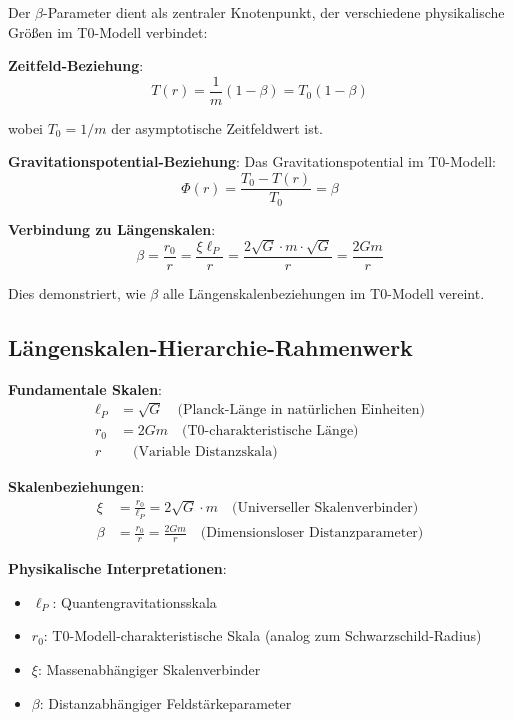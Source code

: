 \documentclass[12pt,a4paper]{article}
\begin{document}
Der $\beta$-Parameter dient als zentraler Knotenpunkt, der verschiedene physikalische Größen im T0-Modell verbindet:

\textbf{Zeitfeld-Beziehung}:
\begin{equation}
	T(r) = \frac{1}{m}(1 - \beta) = T_0(1 - \beta)
\end{equation}

wobei $T_0 = 1/m$ der asymptotische Zeitfeldwert ist.

\textbf{Gravitationspotential-Beziehung}:
Das Gravitationspotential im T0-Modell:
\begin{equation}
	\Phi(r) = \frac{T_0 - T(r)}{T_0} = \beta
\end{equation}

\textbf{Verbindung zu Längenskalen}:
\begin{equation}
	\beta = \frac{r_0}{r} = \frac{\xi \ell_P}{r} = \frac{2\sqrt{G} \cdot m \cdot \sqrt{G}}{r} = \frac{2Gm}{r}
\end{equation}

Dies demonstriert, wie $\beta$ alle Längenskalenbeziehungen im T0-Modell vereint.

\subsection{Längenskalen-Hierarchie-Rahmenwerk}
\label{subsec:length_scale_framework}

\begin{tcolorbox}[colback=blue!5!white,colframe=blue!75!black,title=Vollständige T0-Längenskalen-Hierarchie]
	
	\textbf{Fundamentale Skalen}:
	\begin{align}
		\ell_P &= \sqrt{G} \quad \text{(Planck-Länge in natürlichen Einheiten)} \\
		r_0 &= 2Gm \quad \text{(T0-charakteristische Länge)} \\
		r &\quad \text{(Variable Distanzskala)}
	\end{align}
	
	\textbf{Skalenbeziehungen}:
	\begin{align}
		\xi &= \frac{r_0}{\ell_P} = 2\sqrt{G} \cdot m \quad \text{(Universeller Skalenverbinder)} \\
		\beta &= \frac{r_0}{r} = \frac{2Gm}{r} \quad \text{(Dimensionsloser Distanzparameter)}
	\end{align}
	
	\textbf{Physikalische Interpretationen}:
	\begin{itemize}
		\item $\ell_P$: Quantengravitationsskala
		\item $r_0$: T0-Modell-charakteristische Skala (analog zum Schwarzschild-Radius)
		\item $\xi$: Massenabhängiger Skalenverbinder
		\item $\beta$: Distanzabhängiger Feldstärkeparameter
	\end{itemize}
	
\end{tcolorbox}
\end{document}
